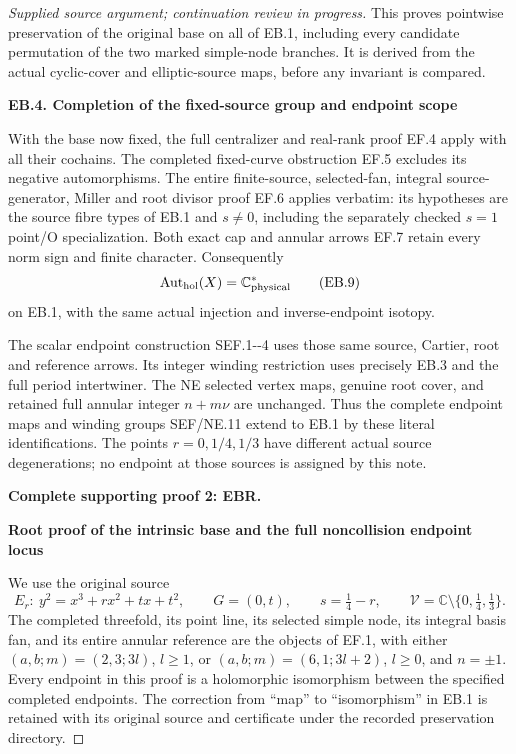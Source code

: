 \begin{proof}[Supplied source argument; continuation review in progress]
This proves pointwise preservation of the original base on all of
EB.1, including every candidate permutation of the two marked
simple-node branches. It is derived from the actual cyclic-cover
and elliptic-source maps, before any invariant is compared.

\par

\medskip\noindent\textbf{EB.4. Completion of the fixed-source group and endpoint scope}

\par\nobreak

With the base now fixed, the full centralizer and real-rank proof
EF.4 apply with all their cochains. The completed fixed-curve
obstruction EF.5 excludes its negative automorphisms. The entire
finite-source, selected-fan, integral source-generator, Miller and
root divisor proof EF.6 applies verbatim: its hypotheses are the
source fibre types of EB.1 and \(s\ne0\), including the separately
checked \(s=1\) point/O specialization. Both exact cap and annular
arrows EF.7 retain every norm sign and finite character.
Consequently
\[
              \operatorname{Aut}_{\rm hol}(X)
                    =\mathbb C^*_{\rm physical}
 \tag{EB.9}
\]
on EB.1, with the same actual injection and inverse-endpoint isotopy.

The scalar endpoint construction SEF.1-\/-4 uses those same source,
Cartier, root and reference arrows. Its integer winding restriction
uses precisely EB.3 and the full period intertwiner. The NE
selected vertex maps, genuine root cover, and retained full
annular integer \(n+m\nu\) are unchanged. Thus the complete
endpoint maps and winding groups SEF/NE.11 extend to EB.1 by these
literal identifications. The points \(r=0,1/4,1/3\) have different
actual source degenerations; no endpoint at those sources is
assigned by this note.



\par\bigskip\noindent\textbf{Complete supporting proof 2: EBR.}\par


\par

\medskip\noindent\textbf{Root proof of the intrinsic base and the full noncollision endpoint locus}

\par\nobreak

We use the original source
\[
 E_r:\ y^2=x^3+rx^2+tx+t^2,\qquad G=(0,t),\qquad
 s=\tfrac14-r,\qquad
 \mathcal V=\mathbb C\setminus\{0,\tfrac14,\tfrac13\}.
 \tag{EBR.1}
\]
The completed threefold, its point line, its selected simple node,
its integral basis fan, and its entire annular reference are the
objects of EF.1, with either
\((a,b;m)=(2,3;3l)\), \(l\geq1\), or
\((a,b;m)=(6,1;3l+2)\), \(l\geq0\), and \(n=\pm1\).
Every endpoint in this proof is a holomorphic isomorphism between
the specified completed endpoints. The correction from ``map'' to
``isomorphism'' in EB.1 is retained with its original source and
certificate under the recorded preservation directory.


\end{proof}

